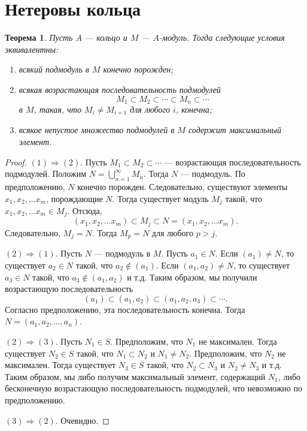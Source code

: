 \documentclass[12pt, titlepage, oneside]{amsbook}
\newtheorem{theorem}{Теорема}[chapter]
\theoremstyle{definition}
\theoremstyle{remark}
\begin{document}
\section{Нетеровы кольца}


\begin{theorem}
	\label{Net1}
	Пусть $A$ --- кольцо и $M$ --- $A$-модуль. Тогда следующие условия эквивалентны:
	\begin{enumerate}
		\item всякий подмодуль в $M$ конечно порожден;
		\item всякая возрастающая последовательность подмодулей $$M_1\subset M_2\subset\cdots\subset M_n\subset\cdots$$ в $M$, такая, что $M_i\neq M_{i+1}$ для любого $i$, конечна;
		\item всякое непустое множество подмодулей в $M$ содержит максимальный элемент.
	\end{enumerate}
\end{theorem}

\begin{proof}
	$(1)\Rightarrow(2)$. Пусть $M_1\subset M_2\subset\cdots$ --- возрастающая последовательность подмодулей. Положим $N=\bigcup\limits_{n=1}^{\infty} M_n$. Тогда $N$ --- подмодуль. По предположению, $N$ конечно порожден. Следовательно, существуют элементы $x_1,x_2,\ldots x_m$, порождающие $N$. Тогда существует модуль $M_j$ такой, что $x_1,x_2,\ldots x_m\in M_j$. Отсюда, $$(x_1,x_2,\ldots x_m)\subset M_j\subset N=(x_1,x_2,\ldots x_m).$$ Следовательно, $M_j=N$. Тогда $M_p=N$ для любого $p>j$.
	
	$(2)\Rightarrow(1)$. Пусть $N$ --- подмодуль в $M$. Пусть $a_1\in N$. Если $(a_1)\neq N$, то существует $a_2\in N$ такой, что $a_2\not\in (a_1)$. Если $(a_1,a_2)\neq N$, то существует $a_3\in N$ такой, что $a_3\not\in (a_1,a_2)$ и т.д. Таким образом, мы получили возрастающую последовательность $$(a_1)\subset(a_1,a_2)\subset(a_1,a_2,a_3)\subset\cdots.$$ Согласно предположению, эта последовательность конечна. Тогда $N=(a_1,a_2,\ldots,a_n)$.
	
	$(2)\Rightarrow(3)$. Пусть $N_1\in S$. Предположим, что $N_1$ не максимален. Тогда существует $N_2\in S$ такой, что $N_1\subset N_2$ и $N_1\neq N_2$. Предположим, что $N_2$ не максимален. Тогда существует $N_3\in S$ такой, что $N_2\subset N_3$ и $N_2\neq N_3$ и т.д. Таким образом, мы либо получим максимальный элемент, содержащий $N_1$, либо бесконечную возрастающую последовательность подмодулей, что невозможно по предположению.
	
	$(3)\Rightarrow(2)$. Очевидно.
\end{proof}
\end{document}
